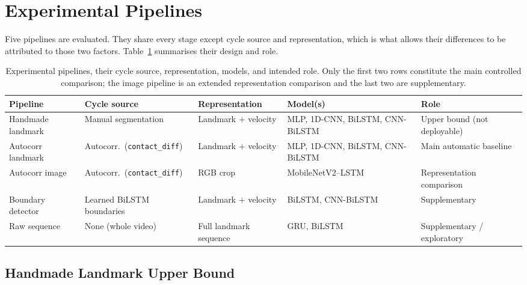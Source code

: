 \section{Experimental Pipelines}
\label{sec:setup-pipelines}

Five pipelines are evaluated. They share every stage except cycle source and
representation, which is what allows their differences to be attributed to those
two factors. Table~\ref{tab:pipelines} summarises their design and role.

\begin{table}[htbp]
\centering
\caption{Experimental pipelines, their cycle source, representation, models, and intended role. Only the first two rows constitute the main controlled comparison; the image pipeline is an extended representation comparison and the last two are supplementary.}
\label{tab:pipelines}
\renewcommand{\arraystretch}{1.3}
\footnotesize %

\begin{tabularx}{\textwidth}{l l X X X}
\toprule
Pipeline & Cycle source & Representation & Model(s) & Role \\
\midrule
Handmade landmark & Manual segmentation & Landmark $+$ velocity & MLP, 1D-CNN, BiLSTM, CNN-BiLSTM & Upper bound (not deployable) \\
\addlinespace
Autocorr landmark & Autocorr.\ (\texttt{contact\_diff}) & Landmark $+$ velocity & MLP, 1D-CNN, BiLSTM, CNN-BiLSTM & Main automatic baseline \\
\addlinespace
Autocorr image & Autocorr.\ (\texttt{contact\_diff}) & RGB crop & MobileNetV2--LSTM & Representation comparison \\
\addlinespace
Boundary detector & Learned BiLSTM boundaries & Landmark $+$ velocity & BiLSTM, CNN-BiLSTM & Supplementary \\
\addlinespace
Raw sequence & None (whole video) & Full landmark sequence & GRU, BiLSTM & Supplementary / exploratory \\
\bottomrule
\end{tabularx}
\end{table}

\subsection{Handmade Landmark Upper Bound}
\label{sec:setup-handmade}

